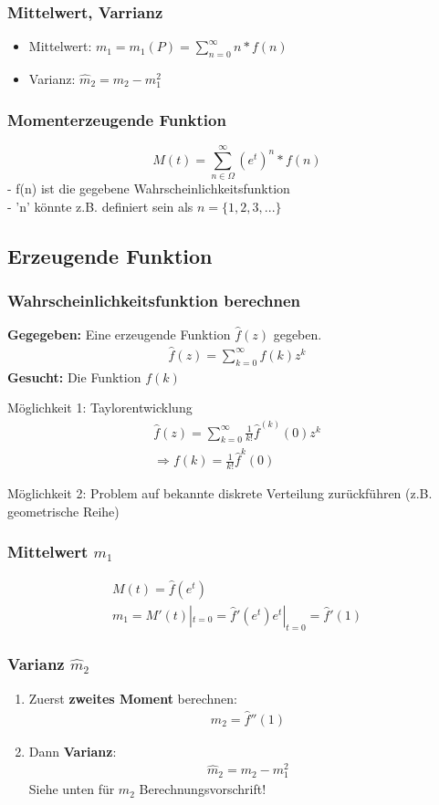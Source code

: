 \documentclass{article}
\begin{document}
\subsubsection{Mittelwert, Varrianz}
\begin{itemize}
	\item Mittelwert: $m_1 = m_1(P) = \sum_{n=0}^\infty n*f(n)$
	\item Varianz: $\widehat{m}_2 = m_2 - m_1^2$
\end{itemize}
\subsubsection{Momenterzeugende Funktion}
\[
	M(t)=\sum_{n\in\Omega}^{\infty}(e^t)^n * f(n)
\]
- f(n) ist die gegebene Wahrscheinlichkeitsfunktion\\
- 'n' k\"onnte z.B. definiert sein als $n=\{1,2,3,...\}$
\subsection{Erzeugende Funktion}
\subsubsection{Wahrscheinlichkeitsfunktion berechnen}
\textbf{Gegegeben:} Eine erzeugende Funktion $\hat{f}(z)$ gegeben.
\begin{align}
	\hat{f}(z) = \sum^{\infty}_{k=0} f(k)z^k
\end{align}
\textbf{Gesucht:} Die Funktion $f(k)$

M\"oglichkeit 1: Taylorentwicklung
\begin{align}
	\hat{f}(z) = \sum_{k=0}^{\infty} \frac{1}{k!}\hat{f}^{(k)}(0)z^k\\
	\Rightarrow f(k) = \frac{1}{k!} \hat{f}^{k}(0)
\end{align}

M\"oglichkeit 2: Problem auf bekannte diskrete Verteilung zur\"uckf\"uhren (z.B. geometrische
Reihe)
\subsubsection{Mittelwert $m_1$}
\begin{align}
	M(t) = \hat{f}(e^t)\\
	m_1  = M'(t)|_{t=0} = \hat{f}'(e^t)e^t|_{t=0} = \hat{f}'(1)
\end{align}
\subsubsection{Varianz $\hat{m}_2$}
\begin{enumerate}
	\item Zuerst \textbf{zweites Moment} berechnen:
		\begin{align}
			m_2 = \hat{f}''(1)
		\end{align}
	\item Dann \textbf{Varianz}:
		\begin{align}
			\hat{m}_2 = m_2 - m_1^2
		\end{align}
		Siehe unten f\"ur $m_2$ Berechnungsvorschrift!
\end{enumerate}
\end{document}
